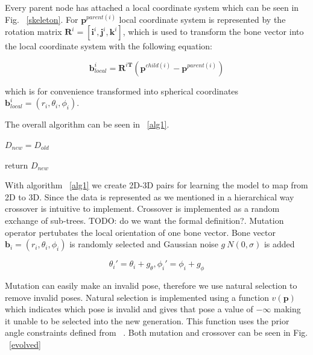 Every parent node has attached a local coordinate system which can be seen in Fig. ~\ref{skeleton}. For $\textbf{p}^{parent(i)}$ local coordinate system is represented by the rotation matrix $\textbf{R}^i = [\textbf{i}^i, \textbf{j}^i, \textbf{k}^i]$, which is used to transform the bone vector into the local coordinate system with the following equation:

$$\textbf{b}_{local} ^{i} = \textbf{R}^{i\textbf{T}}(\textbf{p}^{child(i)}-\textbf{p}^{parent(i)})$$

which is for convenience transformed into spherical coordinates $\textbf{b}_{local}^i = (r_i, \theta _i, \phi _i)$.

The overall algorithm can be seen in ~\ref{alg1}. 

\begin{algorithm}
    
    $D_{new} = D_{old}$
    
    return $D_{new}$
    \caption{Data evolution}
    \label{alg1}
\end{algorithm} 

With algorithm ~\ref{alg1} we create 2D-3D pairs for learning the model to map from 2D to 3D. Since the data is represented as we mentioned in a hierarchical way crossover is intuitive to implement. Crossover is implemented as a random exchange of sub-trees. TODO: do we want the formal definition?. Mutation operator pertubates the local orientation of one bone vector. Bone vector $\textbf{b}_i = (r_i, \theta _i, \phi _i)$ is randomly selected and Gaussian noise $g ~ N(0, \sigma)$ is added

$$\theta _i ' = \theta _i + g_{\theta}, \phi _i ' = \phi _i + g_{\phi}$$

Mutation can easily make an invalid pose, therefore we use natural selection to remove invalid poses. Natural selection is implemented using a function $v(\textbf{p})$ which indicates which pose is invalid and gives that pose a value of $-\infty$ making it unable to be selected into the new generation. This function uses the prior angle constraints defined from ~\cite{Akhter_2015_CVPR}.
Both mutation and crossover can be seen in Fig. ~\ref{evolved}

